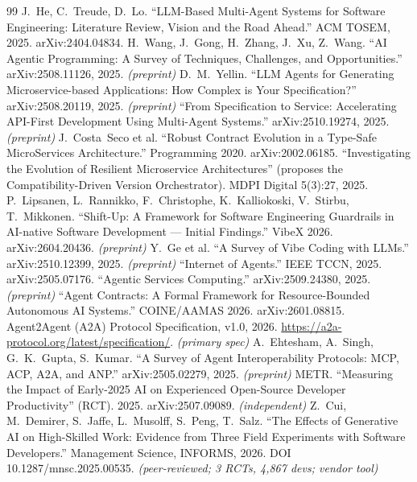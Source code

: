 \documentclass[11pt]{article}
\begin{document}
\begin{thebibliography}{99}
\small
{} J.~He, C.~Treude, D.~Lo. ``LLM-Based Multi-Agent Systems for Software Engineering: Literature Review, Vision and the Road Ahead.'' ACM TOSEM, 2025. arXiv:2404.04834.
 H.~Wang, J.~Gong, H.~Zhang, J.~Xu, Z.~Wang. ``AI Agentic Programming: A Survey of Techniques, Challenges, and Opportunities.'' arXiv:2508.11126, 2025. \emph{(preprint)}
 D.~M.~Yellin. ``LLM Agents for Generating Microservice-based Applications: How Complex is Your Specification?'' arXiv:2508.20119, 2025. \emph{(preprint)}
 ``From Specification to Service: Accelerating API-First Development Using Multi-Agent Systems.'' arXiv:2510.19274, 2025. \emph{(preprint)}
 J.~Costa~Seco et al. ``Robust Contract Evolution in a Type-Safe MicroServices Architecture.'' \textlangle Programming\textrangle{} 2020. arXiv:2002.06185.
 ``Investigating the Evolution of Resilient Microservice Architectures'' (proposes the Compatibility-Driven Version Orchestrator). MDPI Digital 5(3):27, 2025.
 P.~Lipsanen, L.~Rannikko, F.~Christophe, K.~Kalliokoski, V.~Stirbu, T.~Mikkonen. ``Shift-Up: A Framework for Software Engineering Guardrails in AI-native Software Development --- Initial Findings.'' VibeX 2026. arXiv:2604.20436. \emph{(preprint)}
 Y.~Ge et al. ``A Survey of Vibe Coding with LLMs.'' arXiv:2510.12399, 2025. \emph{(preprint)}
 ``Internet of Agents.'' IEEE TCCN, 2025. arXiv:2505.07176.
 ``Agentic Services Computing.'' arXiv:2509.24380, 2025. \emph{(preprint)}
 ``Agent Contracts: A Formal Framework for Resource-Bounded Autonomous AI Systems.'' COINE/AAMAS 2026. arXiv:2601.08815.
 Agent2Agent (A2A) Protocol Specification, v1.0, 2026. \url{https://a2a-protocol.org/latest/specification/}. \emph{(primary spec)}
 A.~Ehtesham, A.~Singh, G.~K.~Gupta, S.~Kumar. ``A Survey of Agent Interoperability Protocols: MCP, ACP, A2A, and ANP.'' arXiv:2505.02279, 2025. \emph{(preprint)}
 METR. ``Measuring the Impact of Early-2025 AI on Experienced Open-Source Developer Productivity'' (RCT). 2025. arXiv:2507.09089. \emph{(independent)}
 Z.~Cui, M.~Demirer, S.~Jaffe, L.~Musolff, S.~Peng, T.~Salz. ``The Effects of Generative AI on High-Skilled Work: Evidence from Three Field Experiments with Software Developers.'' Management Science, INFORMS, 2026. DOI 10.1287/mnsc.2025.00535. \emph{(peer-reviewed; 3 RCTs, 4{,}867 devs; vendor tool)}

\end{thebibliography}
\end{document}
